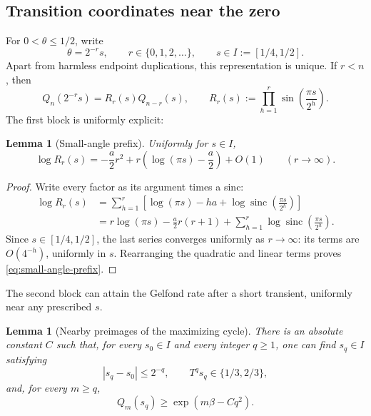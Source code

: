 \documentclass[11pt,oneside]{article}
\numberwithin{equation}{section}
\newtheorem{lemma}[theorem]{Lemma}
\theoremstyle{definition}
\theoremstyle{remark}
\newcommand{\sinc}{\operatorname{sinc}}
\newcommand{\defeq}{\mathrel{:=}}
\begin{document}
\subsection{Transition coordinates near the zero}

For \(0<\theta\le1/2\), write
\begin{equation}
 \theta=2^{-r}s,
 \qquad r\in\{0,1,2,\ldots\},
 \qquad s\in I\defeq[1/4,1/2].
 \label{eq:transition-coordinates}
\end{equation}
Apart from harmless endpoint duplications, this representation is unique.  If \(r<n\),
then
\begin{equation}
 Q_n(2^{-r}s)=R_r(s)Q_{n-r}(s),
 \qquad
 R_r(s)\defeq\prod_{h=1}^{r}
 \sin\!\left(\frac{\pi s}{2^h}\right).
 \label{eq:transition-product}
\end{equation}
The first block is uniformly explicit:
\begin{lemma}[Small-angle prefix]
\label{lem:small-angle-prefix}
Uniformly for \(s\in I\),
\begin{equation}
 \log R_r(s)
 =-\frac a2r^2
  +r\left(\log(\pi s)-\frac a2\right)+O(1)
 \qquad(r\to\infty).
 \label{eq:small-angle-prefix}
\end{equation}
\end{lemma}

\begin{proof}
Write every factor as its argument times a sinc:
\begin{align*}
 \log R_r(s)
 &=\sum_{h=1}^{r}
   \left[\log(\pi s)-ha
   +\log\sinc\!\left(\frac{\pi s}{2^h}\right)\right]\\
 &=r\log(\pi s)-\frac a2r(r+1)
   +\sum_{h=1}^{r}\log\sinc\!\left(\frac{\pi s}{2^h}\right).
\end{align*}
Since \(s\in[1/4,1/2]\), the last series converges uniformly as \(r\to\infty\): its
terms are \(O(4^{-h})\), uniformly in \(s\).  Rearranging the quadratic and linear terms
proves \eqref{eq:small-angle-prefix}.
\end{proof}

The second block can attain the Gelfond rate after a short transient, uniformly near any
prescribed \(s\).

\begin{lemma}[Nearby preimages of the maximizing cycle]
\label{lem:dense-preimages}
There is an absolute constant \(C\) such that, for every \(s_0\in I\) and every integer
\(q\ge1\), one can find \(s_q\in I\) satisfying
\begin{equation}
 |s_q-s_0|\le2^{-q},
 \qquad T^qs_q\in\{1/3,2/3\},
 \label{eq:dense-preimages}
\end{equation}
and, for every \(m\ge q\),
\begin{equation}
 Q_m(s_q)\ge\exp(m\beta-Cq^2).
 \label{eq:dense-preimage-lower}
\end{equation}
\end{lemma}
\end{document}
